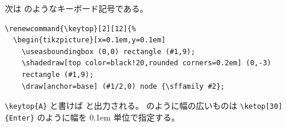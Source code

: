次は  のようなキーボード記号である。
\begin{mdframed}[roundcorner=0.50zw,leftmargin=3.00zw,rightmargin=3.00zw,skipabove=0.40zw,skipbelow=0.40zw,innertopmargin=4.00pt,innerbottommargin=4.00pt,innerleftmargin=5.00pt,innerrightmargin=5.00pt,linecolor=gray!020,linewidth=0.50pt,backgroundcolor=gray!20]
\begin{verbatim}
\renewcommand{\keytop}[2][12]{%
  \begin{tikzpicture}[x=0.1em,y=0.1em]
    \useasboundingbox (0,0) rectangle (#1,9);
    \shadedraw[top color=black!20,rounded corners=0.2em] (0,-3)
    rectangle (#1,9);
    \draw[anchor=base] (#1/2,0) node {\sffamily #2};
\end{verbatim}
\end{mdframed}
\verb'\keytop{A}' と書けば  と出力される。
 のように幅の広いものは \verb'\ketop[30]{Enter}' のように幅を 0.1em 単位で指定する。\enlargethispage{+1.00zw}
